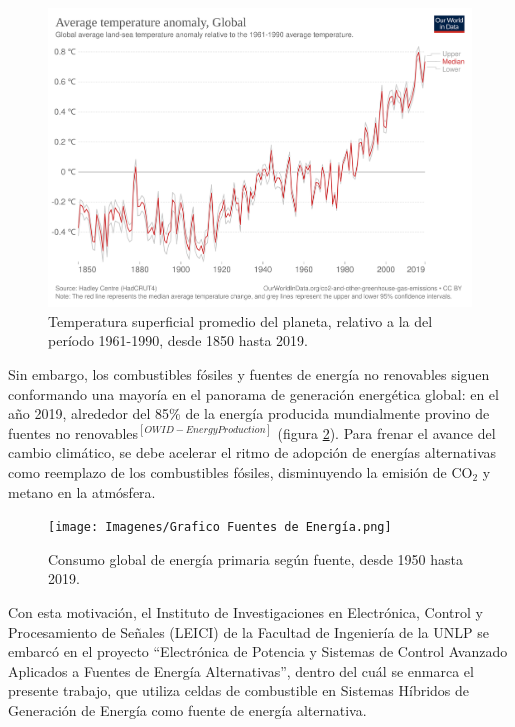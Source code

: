 \begin{figure}[H]
    \centering
    \includegraphics[scale=0.11]{Imagenes/Grafico Temperatura.png}
    \caption{Temperatura superficial promedio del planeta, relativo a la del período 1961-1990, desde 1850 hasta 2019.}
    \label{Temp_Tierra}
\end{figure}

Sin embargo, los combustibles fósiles y fuentes de energía no renovables siguen conformando una mayoría en el panorama de generación energética global: en el año 2019, alrededor del 85\% de la energía producida mundialmente provino de fuentes no renovables$^{[OWID-EnergyProduction]}$ (figura \ref{Emisiones_CO2}). Para frenar el avance del cambio climático, se debe acelerar el ritmo de adopción de energías alternativas como reemplazo de los combustibles fósiles, disminuyendo la emisión de CO$_2$ y metano en la atmósfera.

\begin{figure}[H]
    \centering
    \texttt{[image: Imagenes/Grafico Fuentes de Energía.png]}
    \caption{Consumo global de energía primaria según fuente, desde 1950 hasta 2019.}
    \label{Emisiones_CO2}
\end{figure}

Con esta motivación, el Instituto de Investigaciones en Electrónica, Control y Procesamiento de Señales (LEICI) de la Facultad de Ingeniería de la UNLP se embarcó en el proyecto ``Electrónica de Potencia y Sistemas de Control Avanzado Aplicados a Fuentes de Energía Alternativas'', dentro del cuál se enmarca el presente trabajo, que utiliza celdas de combustible en Sistemas Híbridos de Generación de Energía como fuente de energía alternativa.\\

